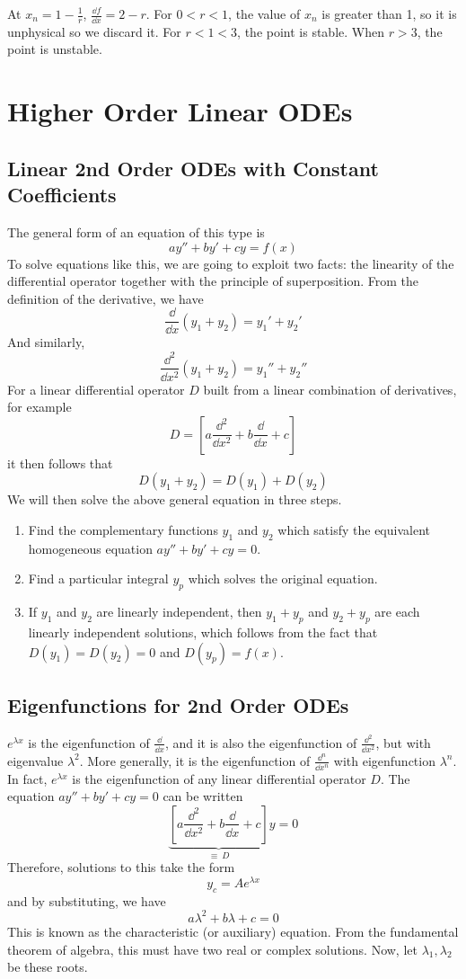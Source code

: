 \documentclass{article}
\begin{document}
At $x_n = 1 - \frac{1}{r}$, $\frac{\dd f}{\dd x} = 2 - r$. For $0 < r < 1$, the value of $x_n$ is greater than 1, so it is unphysical so we discard it. For $r < 1 < 3$, the point is stable. When $r > 3$, the point is unstable.

\section{Higher Order Linear ODEs}
\subsection{Linear 2nd Order ODEs with Constant Coefficients}
The general form of an equation of this type is
\[ ay'' + by' + cy = f(x) \]
To solve equations like this, we are going to exploit two facts: the linearity of the differential operator together with the principle of superposition. From the definition of the derivative, we have
\[ \frac{\dd}{\dd x}(y_1 + y_2) = y_1' + y_2' \]
And similarly,
\[ \frac{\dd^2}{\dd x^2}(y_1 + y_2) = y_1'' + y_2'' \]
For a linear differential operator $D$ built from a linear combination of derivatives, for example
\[ D = \left[ a \frac{\dd^2}{\dd x^2} + b\frac{\dd}{\dd x} + c \right] \]
it then follows that
\[ D(y_1 + y_2) = D(y_1) + D(y_2) \]
We will then solve the above general equation in three steps.
\begin{enumerate}
	\item Find the complementary functions $y_1$ and $y_2$ which satisfy the equivalent homogeneous equation $ay'' + by' + cy = 0$.
	\item Find a particular integral $y_p$ which solves the original equation.
	\item If $y_1$ and $y_2$ are linearly independent, then $y_1 + y_p$ and $y_2 + y_p$ are each linearly independent solutions, which follows from the fact that $D(y_1) = D(y_2) = 0$ and $D(y_p) = f(x)$.
\end{enumerate}

\subsection{Eigenfunctions for 2nd Order ODEs}
$e^{\lambda x}$ is the eigenfunction of $\frac{\dd}{\dd x}$, and it is also the eigenfunction of $\frac{\dd^2}{\dd x^2}$, but with eigenvalue $\lambda^2$. More generally, it is the eigenfunction of $\frac{\dd^n}{\dd x^n}$ with eigenfunction $\lambda^n$. In fact, $e^{\lambda x}$ is the eigenfunction of any linear differential operator $D$. The equation $ ay'' + by' + cy = 0 $ can be written
\[ \underbrace{\left[ a \frac{\dd^2}{\dd x^2} + b\frac{\dd}{\dd x} + c \right]}_{\equiv\ D} y = 0 \]
Therefore, solutions to this take the form
\[ y_c = Ae^{\lambda x} \]
and by substituting, we have
\[ a \lambda^2 + b\lambda + c = 0 \]
This is known as the characteristic (or auxiliary) equation. From the fundamental theorem of algebra, this must have two real or complex solutions. Now, let $\lambda_1, \lambda_2$ be these roots.
\end{document}
